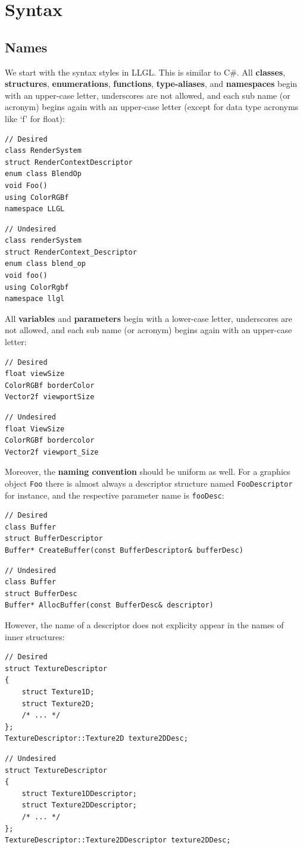 \documentclass{article}
\begin{document}
\newpage
\section*{Syntax}

\subsection*{Names}

We start with the syntax styles in LLGL. This is similar to C\#.
All \textbf{classes}, \textbf{structures}, \textbf{enumerations}, \textbf{functions}, \textbf{type-aliases},
and \textbf{namespaces} begin with an upper-case letter, underscores are not allowed,
and each sub name (or acronym) begins again with an upper-case letter (except for data type acronyms like `f' for float):
\begin{lstlisting}
// Desired
class RenderSystem
struct RenderContextDescriptor
enum class BlendOp
void Foo()
using ColorRGBf
namespace LLGL
\end{lstlisting}
\begin{lstlisting}
// Undesired
class renderSystem
struct RenderContext_Descriptor
enum class blend_op
void foo()
using ColorRgbf
namespace llgl
\end{lstlisting}
All \textbf{variables} and \textbf{parameters} begin with a lower-case letter, underscores are not allowed,
and each sub name (or acronym) begins again with an upper-case letter:
\begin{lstlisting}
// Desired
float viewSize
ColorRGBf borderColor
Vector2f viewportSize
\end{lstlisting}
\begin{lstlisting}
// Undesired
float ViewSize
ColorRGBf bordercolor
Vector2f viewport_Size
\end{lstlisting}
Moreover, the \textbf{naming convention} should be uniform as well. For a graphics object \texttt{Foo}
there is almost always a descriptor structure named \texttt{FooDescriptor} for instance,
and the respective parameter name is \texttt{fooDesc}:
\begin{lstlisting}
// Desired
class Buffer
struct BufferDescriptor
Buffer* CreateBuffer(const BufferDescriptor& bufferDesc)
\end{lstlisting}
\begin{lstlisting}
// Undesired
class Buffer
struct BufferDesc
Buffer* AllocBuffer(const BufferDesc& descriptor)
\end{lstlisting}
However, the name of a descriptor does not explicity appear in the names of inner structures:
\begin{lstlisting}
// Desired
struct TextureDescriptor
{
	struct Texture1D;
	struct Texture2D;
	/* ... */
};
TextureDescriptor::Texture2D texture2DDesc;
\end{lstlisting}
\begin{lstlisting}
// Undesired
struct TextureDescriptor
{
	struct Texture1DDescriptor;
	struct Texture2DDescriptor;
	/* ... */
};
TextureDescriptor::Texture2DDescriptor texture2DDesc;
\end{lstlisting}
\end{document}
